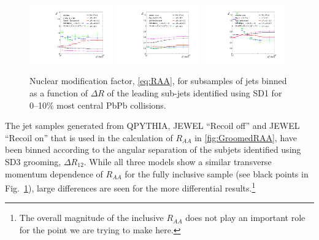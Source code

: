 \begin{figure}[th]
\centering
\includegraphics[width=0.32\textwidth]{figures/Observables_RAA/Plot9}
\includegraphics[width=0.32\textwidth]{figures/Observables_RAA/Plot3}
\includegraphics[width=0.32\textwidth]{figures/Observables_RAA/Plot4}
\caption{Nuclear modification factor, \autoref{eq:RAA}, for subsamples of jets binned as a function of $\Delta R$ of the leading sub-jets identified using SD1 for 0--10\% most central PbPb collisions.
}
\label{fig:GroomedRAA}
\end{figure}
The jet samples generated from QPYTHIA, JEWEL ``Recoil off'' and JEWEL ``Recoil on'' that is used in the calculation of $R_{AA}$ in \autoref{fig:GroomedRAA}, have been binned according to the angular separation of the subjets identified using SD3 grooming, $\Delta R_{12}$. While all three models show a similar transverse momentum dependence of $R_{AA}$ for the fully inclusive sample (see black points in Fig.~\ref{fig:GroomedRAA}), large differences are seen for the more differential  results.\footnote{The overall magnitude of the inclusive $R_{AA}$ does not play an important role for the point we are trying to make here.} 

